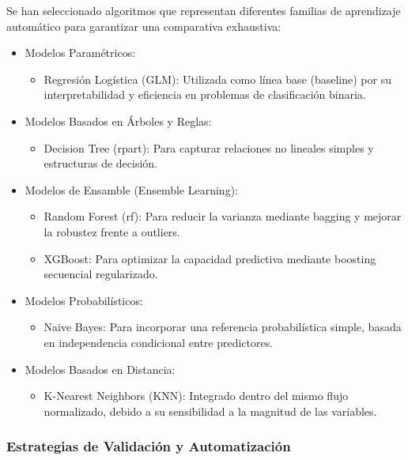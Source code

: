 Se han seleccionado algoritmos que representan diferentes familias de
aprendizaje automático para garantizar una comparativa exhaustiva:

\begin{itemize}
  \item Modelos Paramétricos:
    \begin{itemize}
      \item Regresión Logística (GLM): Utilizada como línea base (baseline) por su
        interpretabilidad y eficiencia en problemas de clasificación binaria.
    \end{itemize}
  \item Modelos Basados en Árboles y Reglas:
    \begin{itemize}
      \item Decision Tree (rpart): Para capturar relaciones no lineales simples y
        estructuras de decisión.
    \end{itemize}
  \item Modelos de Ensamble (Ensemble Learning):
    \begin{itemize}
      \item Random Forest (rf): Para reducir la varianza mediante bagging y mejorar
        la robustez frente a outliers.
      \item XGBoost: Para optimizar la capacidad predictiva mediante boosting
        secuencial regularizado.
    \end{itemize}
  \item Modelos Probabilísticos:
    \begin{itemize}
      \item Naive Bayes: Para incorporar una referencia probabilística simple,
        basada en independencia condicional entre predictores.
    \end{itemize}
  \item Modelos Basados en Distancia:
    \begin{itemize}
      \item K-Nearest Neighbors (KNN): Integrado dentro del mismo flujo
        normalizado, debido a su sensibilidad a la magnitud de las variables.
    \end{itemize}
\end{itemize}

\subsubsection{Estrategias de Validación y Automatización}

